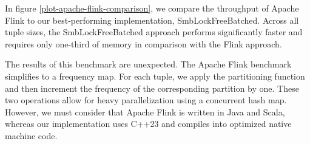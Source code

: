 In figure \ref{plot-apache-flink-comparison}, we compare the throughput of Apache Flink to our best-performing implementation, SmbLockFreeBatched.
Across all tuple sizes, the SmbLockFreeBatched approach performs significantly faster and requires only one-third of memory in comparison with the Flink approach.

The results of this benchmark are unexpected.
The Apache Flink benchmark simplifies to a frequency map.
For each tuple, we apply the partitioning function and then increment the frequency of the corresponding partition by one.
These two operations allow for heavy parallelization using a concurrent hash map.
However, we must consider that Apache Flink is written in Java and Scala, whereas our implementation uses C++23 and compiles into optimized native machine code.
